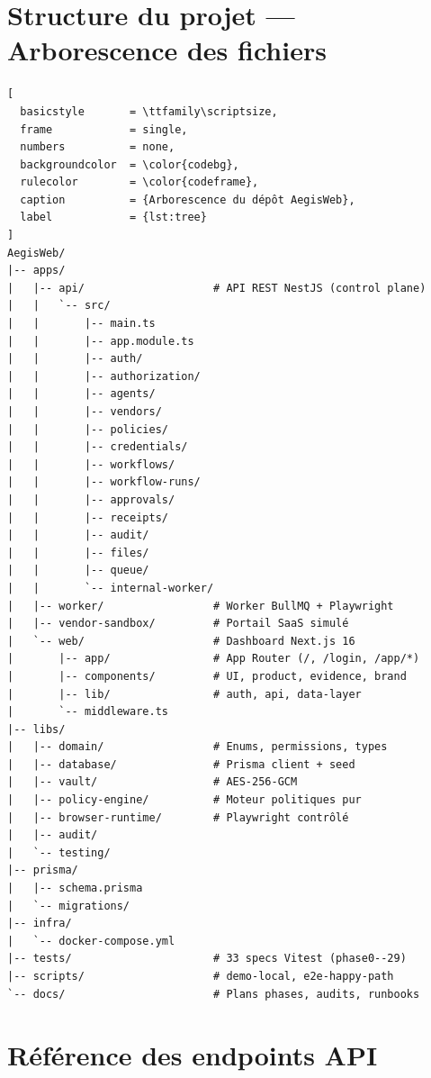 \clearpage
\appendix

\chapter{Structure du projet — Arborescence des fichiers}

\begin{lstlisting}[
  basicstyle       = \ttfamily\scriptsize,
  frame            = single,
  numbers          = none,
  backgroundcolor  = \color{codebg},
  rulecolor        = \color{codeframe},
  caption          = {Arborescence du dépôt AegisWeb},
  label            = {lst:tree}
]
AegisWeb/
|-- apps/
|   |-- api/                    # API REST NestJS (control plane)
|   |   `-- src/
|   |       |-- main.ts
|   |       |-- app.module.ts
|   |       |-- auth/
|   |       |-- authorization/
|   |       |-- agents/
|   |       |-- vendors/
|   |       |-- policies/
|   |       |-- credentials/
|   |       |-- workflows/
|   |       |-- workflow-runs/
|   |       |-- approvals/
|   |       |-- receipts/
|   |       |-- audit/
|   |       |-- files/
|   |       |-- queue/
|   |       `-- internal-worker/
|   |-- worker/                 # Worker BullMQ + Playwright
|   |-- vendor-sandbox/         # Portail SaaS simulé
|   `-- web/                    # Dashboard Next.js 16
|       |-- app/                # App Router (/, /login, /app/*)
|       |-- components/         # UI, product, evidence, brand
|       |-- lib/                # auth, api, data-layer
|       `-- middleware.ts
|-- libs/
|   |-- domain/                 # Enums, permissions, types
|   |-- database/               # Prisma client + seed
|   |-- vault/                  # AES-256-GCM
|   |-- policy-engine/          # Moteur politiques pur
|   |-- browser-runtime/        # Playwright contrôlé
|   |-- audit/
|   `-- testing/
|-- prisma/
|   |-- schema.prisma
|   `-- migrations/
|-- infra/
|   `-- docker-compose.yml
|-- tests/                      # 33 specs Vitest (phase0--29)
|-- scripts/                    # demo-local, e2e-happy-path
`-- docs/                       # Plans phases, audits, runbooks
\end{lstlisting}

\chapter{Référence des endpoints API}

